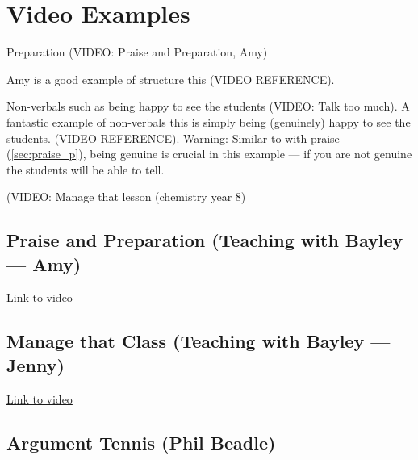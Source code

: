 \documentclass[12pt]{report}
\begin{document}
\chapter{Video Examples}
\label{chap:video_examples}

Preparation (VIDEO: Praise and Preparation, Amy)

 Amy is a good example of structure this (VIDEO REFERENCE).

Non-verbals such as being happy to see the students (VIDEO: Talk too much).
A fantastic example of non-verbals this is simply being (genuinely) happy to see the students.
(VIDEO REFERENCE). Warning: Similar to with praise (\ref{sec:praise_p}), being genuine is crucial in this example --- if you are not genuine the students will be able to tell.



 (VIDEO: Manage that lesson (chemistry year 8)


\section{Praise and Preparation (Teaching with Bayley --- Amy)}

\href{https://youtu.be/KkXRjrSsMQg}{Link to video}


% 



\section{Manage that Class (Teaching with Bayley --- Jenny)}

\href{http://archive.teachfind.com/ttv/www.teachers.tv/videos/manage-that-class-year-8-friday.html}{Link to video}



% 




\section{Argument Tennis (Phil Beadle)}
\end{document}
